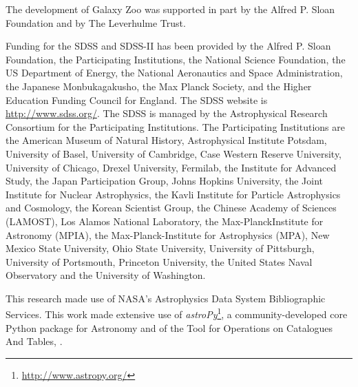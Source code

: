 \documentclass[a4paper,fleqn,usenatbib,useAMS]{mnras}
\begin{document}
The development of Galaxy Zoo was supported in part by the Alfred P. Sloan Foundation and by The Leverhulme Trust. 

Funding for the SDSS and SDSS-II has been provided by the Alfred P. Sloan Foundation, the Participating Institutions, the National Science Foundation, the US Department of Energy, the National Aeronautics and Space Administration, the Japanese Monbukagakusho, the Max Planck Society, and the Higher Education Funding Council for England. The SDSS website is \url{http://www.sdss.org/}. The SDSS is managed by the Astrophysical Research Consortium for the Participating Institutions. The Participating Institutions are the American Museum of Natural History, Astrophysical Institute Potsdam, University of Basel, University of Cambridge, Case Western Reserve University, University of Chicago, Drexel University, Fermilab, the Institute for Advanced Study, the Japan Participation Group, Johns Hopkins University, the Joint Institute for Nuclear Astrophysics, the Kavli Institute for Particle Astrophysics and Cosmology, the Korean Scientist Group, the Chinese Academy of Sciences (LAMOST), Los Alamos National Laboratory, the Max-PlanckInstitute for Astronomy (MPIA), the Max-Planck-Institute for Astrophysics (MPA), New Mexico State University, Ohio State University, University of Pittsburgh, University of Portsmouth, Princeton University, the United States Naval Observatory and the University of Washington.

This research made use of NASA's Astrophysics Data System Bibliographic Services. This work made extensive use of \textit{astroPy}\footnote{\url{http://www.astropy.org/}}, a community-developed core Python package for Astronomy \citep{Astropy} and of the Tool for Operations on Catalogues And Tables, \citep[TOPCAT\footnote{\url{http://www.star.bris.ac.uk/~mbt/}};][]{Topcat}.







\bsp	%
\label{lastpage}
\end{document}
